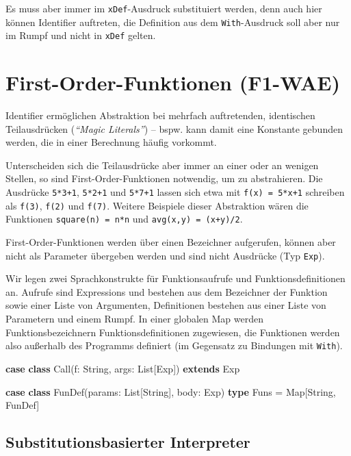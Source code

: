 \documentclass[]{article}
\newenvironment{Shaded}{}{}
\newcommand{\FunctionTok}[1]{\textcolor[rgb]{0.02,0.16,0.49}{#1}}
\newcommand{\KeywordTok}[1]{\textcolor[rgb]{0.00,0.44,0.13}{\textbf{#1}}}
\newcommand{\NormalTok}[1]{#1}
\begin{document}
Es muss aber immer im \texttt{xDef}-Ausdruck substituiert werden, denn
auch hier können Identifier auftreten, die Definition aus dem
\texttt{With}-Ausdruck soll aber nur im Rumpf und nicht in \texttt{xDef}
gelten.

\hypertarget{first-order-funktionen-f1-wae}{%
\section{First-Order-Funktionen
(F1-WAE)}}

Identifier ermöglichen Abstraktion bei mehrfach auftretenden,
identischen Teilausdrücken (\emph{``Magic Literals''}) -- bspw. kann
damit eine Konstante gebunden werden, die in einer Berechnung häufig
vorkommt.

Unterscheiden sich die Teilausdrücke aber immer an einer oder an wenigen
Stellen, so sind First-Order-Funktionen notwendig, um zu abstrahieren.
Die Ausdrücke \texttt{5*3+1}, \texttt{5*2+1} und \texttt{5*7+1} lassen
sich etwa mit \texttt{f(x)\ =\ 5*x+1} schreiben als \texttt{f(3)},
\texttt{f(2)} und \texttt{f(7)}. Weitere Beispiele dieser Abstraktion
wären die Funktionen \texttt{square(n)\ =\ n*n} und
\texttt{avg(x,y)\ =\ (x+y)/2}.

First-Order-Funktionen werden über einen Bezeichner aufgerufen, können
aber nicht als Parameter übergeben werden und sind nicht Ausdrücke (Typ
\texttt{Exp}).

Wir legen zwei Sprachkonstrukte für Funktionsaufrufe und
Funktionsdefinitionen an. Aufrufe sind Expressions und bestehen aus dem
Bezeichner der Funktion sowie einer Liste von Argumenten, Definitionen
bestehen aus einer Liste von Parametern und einem Rumpf. In einer
globalen Map werden Funktionsbezeichnern Funktionsdefinitionen
zugewiesen, die Funktionen werden also außerhalb des Programms definiert
(im Gegensatz zu Bindungen mit \texttt{With}).

\begin{Shaded}
\begin{Highlighting}[]
\KeywordTok{case} \KeywordTok{class} \FunctionTok{Call}\NormalTok{(f: String, args: List[Exp]) }\KeywordTok{extends}\NormalTok{ Exp}

\KeywordTok{case} \KeywordTok{class} \FunctionTok{FunDef}\NormalTok{(params: List[String], body: Exp)}
\KeywordTok{type}\NormalTok{ Funs = Map[String, FunDef]}
\end{Highlighting}
\end{Shaded}

\hypertarget{substitutionsbasierter-interpreter}{%
\subsection{Substitutionsbasierter
Interpreter}\label{substitutionsbasierter-interpreter}}
\end{document}
